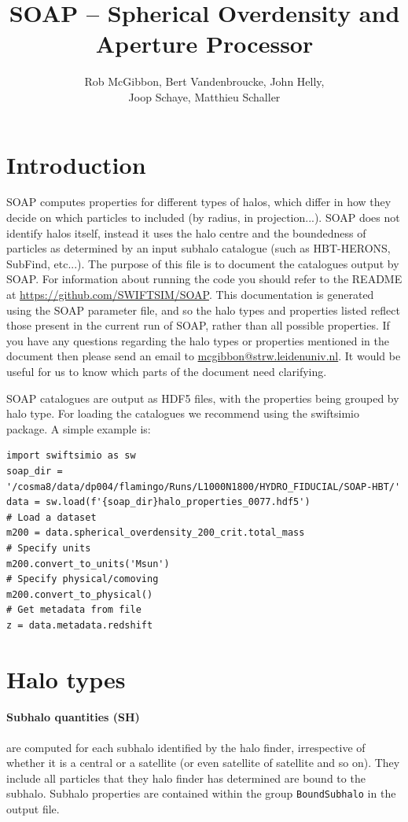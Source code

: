 \documentclass{article}
\title{SOAP -- Spherical Overdensity and Aperture Processor}
\author{Rob McGibbon, Bert Vandenbroucke, John Helly, \\Joop Schaye, Matthieu Schaller}
\date{}
\begin{document}
\maketitle



\section{Introduction}

SOAP computes properties for different types of halos, which differ in how they decide
on which particles to included (by radius, in projection...). SOAP does not identify
halos itself, instead it uses the halo centre and the boundedness of particles as determined
by an input subhalo catalogue (such as HBT-HERONS, SubFind, etc...).
The purpose of this file is to document the catalogues output by SOAP. For information about running
the code you should refer to the README at \href{https://github.com/SWIFTSIM/SOAP}{https://github.com/SWIFTSIM/SOAP}.
This documentation is generated using the SOAP parameter file, and so the halo types and properties 
listed reflect those present in the current run of SOAP, rather than all possible properties.
If you have any questions regarding the halo types or properties mentioned in the document then
please send an email to \href{mailto:mcgibbon@strw.leidenuniv.nl}{mcgibbon@strw.leidenuniv.nl}.
It would be useful for us to know which parts of the document need clarifying.

SOAP catalogues are output as HDF5 files, with the properties being grouped by halo type.
For loading the catalogues we recommend using the swiftsimio package. A simple example is:
\begin{verbatim}
import swiftsimio as sw
soap_dir = '/cosma8/data/dp004/flamingo/Runs/L1000N1800/HYDRO_FIDUCIAL/SOAP-HBT/'
data = sw.load(f'{soap_dir}halo_properties_0077.hdf5')
# Load a dataset
m200 = data.spherical_overdensity_200_crit.total_mass
# Specify units
m200.convert_to_units('Msun')
# Specify physical/comoving
m200.convert_to_physical()
# Get metadata from file
z = data.metadata.redshift
\end{verbatim}

\section{Halo types}

\paragraph{Subhalo quantities (SH)} are computed for each subhalo identified by the halo finder, irrespective of whether 
it is a central or a satellite (or even satellite of satellite and so on). They include all particles 
that they halo finder has determined are bound to the subhalo. Subhalo properties are contained within the group 
\verb+BoundSubhalo+ in the output file.
\end{document}
